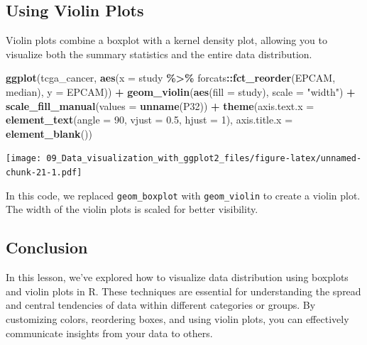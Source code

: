 \documentclass[
]{book}
\newenvironment{Shaded}{\begin{snugshade}}{\end{snugshade}}
\newcommand{\AttributeTok}[1]{\textcolor[rgb]{0.13,0.29,0.53}{#1}}
\newcommand{\DecValTok}[1]{\textcolor[rgb]{0.00,0.00,0.81}{#1}}
\newcommand{\FloatTok}[1]{\textcolor[rgb]{0.00,0.00,0.81}{#1}}
\newcommand{\FunctionTok}[1]{\textcolor[rgb]{0.13,0.29,0.53}{\textbf{#1}}}
\newcommand{\NormalTok}[1]{#1}
\newcommand{\SpecialCharTok}[1]{\textcolor[rgb]{0.81,0.36,0.00}{\textbf{#1}}}
\newcommand{\StringTok}[1]{\textcolor[rgb]{0.31,0.60,0.02}{#1}}
\begin{document}
\hypertarget{using-violin-plots}{%
\subsection{Using Violin Plots}\label{using-violin-plots}}

Violin plots combine a boxplot with a kernel density plot, allowing you to visualize both the summary statistics and the entire data distribution.

\begin{Shaded}
\begin{Highlighting}[]
\FunctionTok{ggplot}\NormalTok{(tcga\_cancer, }\FunctionTok{aes}\NormalTok{(}\AttributeTok{x =}\NormalTok{ study }\SpecialCharTok{\%\textgreater{}\%}
\NormalTok{                          forcats}\SpecialCharTok{::}\FunctionTok{fct\_reorder}\NormalTok{(EPCAM, median), }
                        \AttributeTok{y =}\NormalTok{ EPCAM)) }\SpecialCharTok{+}
  \FunctionTok{geom\_violin}\NormalTok{(}\FunctionTok{aes}\NormalTok{(}\AttributeTok{fill =}\NormalTok{ study), }\AttributeTok{scale =} \StringTok{"width"}\NormalTok{) }\SpecialCharTok{+}
  \FunctionTok{scale\_fill\_manual}\NormalTok{(}\AttributeTok{values =} \FunctionTok{unname}\NormalTok{(P32)) }\SpecialCharTok{+}
  \FunctionTok{theme}\NormalTok{(}\AttributeTok{axis.text.x =} \FunctionTok{element\_text}\NormalTok{(}\AttributeTok{angle =} \DecValTok{90}\NormalTok{, }\AttributeTok{vjust =} \FloatTok{0.5}\NormalTok{, }\AttributeTok{hjust =} \DecValTok{1}\NormalTok{),}
        \AttributeTok{axis.title.x =} \FunctionTok{element\_blank}\NormalTok{())}
\end{Highlighting}
\end{Shaded}

\texttt{[image: 09\_Data\_visualization\_with\_ggplot2\_files/figure-latex/unnamed-chunk-21-1.pdf]}

In this code, we replaced \texttt{geom\_boxplot} with \texttt{geom\_violin} to create a violin plot. The width of the violin plots is scaled for better visibility.

\hypertarget{conclusion-24}{%
\subsection{Conclusion}\label{conclusion-24}}

In this lesson, we've explored how to visualize data distribution using boxplots and violin plots in R. These techniques are essential for understanding the spread and central tendencies of data within different categories or groups. By customizing colors, reordering boxes, and using violin plots, you can effectively communicate insights from your data to others.
\end{document}
